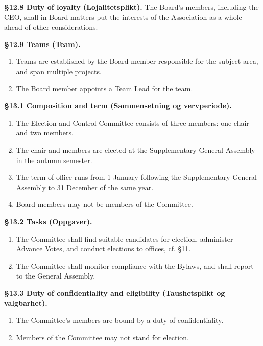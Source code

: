 \documentclass{../../../Common/Latex/Templates/rapport}
\begin{document}
\textbf{\S 12.8 Duty of loyalty (Lojalitetsplikt).}\label{bylaw:12.8} The Board's members, including the CEO, shall in Board matters put the interests of the Association as a whole ahead of other considerations.

\textbf{\S 12.9 Teams (Team).}\label{bylaw:12.9}
\begin{enumerate}
  \item Teams are established by the Board member responsible for the subject area, and span multiple projects.
  \item The Board member appoints a Team Lead for the team.
\end{enumerate}

\label{bylaw:13}
\textbf{\S 13.1 Composition and term (Sammensetning og vervperiode).}\label{bylaw:13.1}
\begin{enumerate}
  \item The Election and Control Committee consists of three members: one chair and two members.
  \item The chair and members are elected at the Supplementary General Assembly in the autumn semester.
  \item The term of office runs from 1 January following the Supplementary General Assembly to 31 December of the same year.
  \item Board members may not be members of the Committee.
\end{enumerate}

\textbf{\S 13.2 Tasks (Oppgaver).}\label{bylaw:13.2}
\begin{enumerate}
  \item The Committee shall find suitable candidates for election, administer Advance Votes, and conduct elections to offices, cf. \hyperref[bylaw:11]{\S 11}.
  \item The Committee shall monitor compliance with the Bylaws, and shall report to the General Assembly.
\end{enumerate}

\textbf{\S 13.3 Duty of confidentiality and eligibility (Taushetsplikt og valgbarhet).}\label{bylaw:13.3}
\begin{enumerate}
  \item The Committee's members are bound by a duty of confidentiality.
  \item Members of the Committee may not stand for election.
\end{enumerate}
\end{document}
